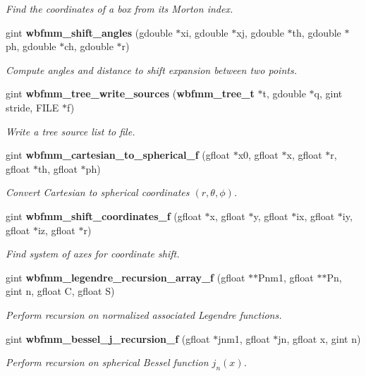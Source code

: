 \begin{DoxyCompactItemize}
\begin{DoxyCompactList}\small\item\em Find the coordinates of a box from its Morton index. \end{DoxyCompactList}\item 
gint {\bf wbfmm\+\_\+shift\+\_\+angles} (gdouble $\ast$xi, gdouble $\ast$xj, gdouble $\ast$th, gdouble $\ast$ph, gdouble $\ast$ch, gdouble $\ast$r)
\begin{DoxyCompactList}\small\item\em Compute angles and distance to shift expansion between two points. \end{DoxyCompactList}\item 
gint {\bf wbfmm\+\_\+tree\+\_\+write\+\_\+sources} ({\bf wbfmm\+\_\+tree\+\_\+t} $\ast$t, gdouble $\ast$q, gint stride, F\+I\+L\+E $\ast$f)
\begin{DoxyCompactList}\small\item\em Write a tree source list to file. \end{DoxyCompactList}\item 
gint {\bf wbfmm\+\_\+cartesian\+\_\+to\+\_\+spherical\+\_\+f} (gfloat $\ast$x0, gfloat $\ast$x, gfloat $\ast$r, gfloat $\ast$th, gfloat $\ast$ph)
\begin{DoxyCompactList}\small\item\em Convert Cartesian to spherical coordinates $(r,\theta,\phi)$. \end{DoxyCompactList}\item 
gint {\bf wbfmm\+\_\+shift\+\_\+coordinates\+\_\+f} (gfloat $\ast$x, gfloat $\ast$y, gfloat $\ast$ix, gfloat $\ast$iy, gfloat $\ast$iz, gfloat $\ast$r)
\begin{DoxyCompactList}\small\item\em Find system of axes for coordinate shift. \end{DoxyCompactList}\item 
gint {\bf wbfmm\+\_\+legendre\+\_\+recursion\+\_\+array\+\_\+f} (gfloat $\ast$$\ast$Pnm1, gfloat $\ast$$\ast$Pn, gint n, gfloat C, gfloat S)
\begin{DoxyCompactList}\small\item\em Perform recursion on normalized associated Legendre functions. \end{DoxyCompactList}\item 
gint {\bf wbfmm\+\_\+bessel\+\_\+j\+\_\+recursion\+\_\+f} (gfloat $\ast$jnm1, gfloat $\ast$jn, gfloat x, gint n)
\begin{DoxyCompactList}\small\item\em Perform recursion on spherical Bessel function $j_{n}(x)$. \end{DoxyCompactList}\item 

\end{DoxyCompactItemize}
